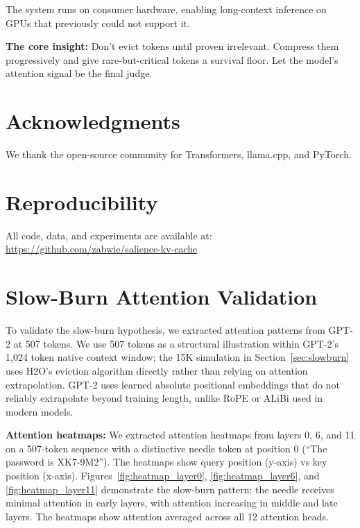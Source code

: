 \documentclass[11pt]{article}
\begin{document}
The system runs on consumer hardware, enabling long-context inference on GPUs that previously could not support it.

\textbf{The core insight:} Don't evict tokens until proven irrelevant. Compress them progressively and give rare-but-critical tokens a survival floor. Let the model's attention signal be the final judge.

\section*{Acknowledgments}

We thank the open-source community for Transformers, llama.cpp, and PyTorch.

\section*{Reproducibility}

All code, data, and experiments are available at: \url{https://github.com/zabwie/salience-kv-cache}

\appendix

\section{Slow-Burn Attention Validation}\label{sec:attention_validation}

To validate the slow-burn hypothesis, we extracted attention patterns from GPT-2 at 507 tokens. We use 507 tokens as a structural illustration within GPT-2's 1,024 token native context window; the 15K simulation in Section~\ref{sec:slowburn} uses H2O's eviction algorithm directly rather than relying on attention extrapolation. GPT-2 uses learned absolute positional embeddings that do not reliably extrapolate beyond training length, unlike RoPE or ALiBi used in modern models.

\textbf{Attention heatmaps:} We extracted attention heatmaps from layers 0, 6, and 11 on a 507-token sequence with a distinctive needle token at position 0 (``The password is XK7-9M2''). The heatmaps show query position (y-axis) vs key position (x-axis). Figures~\ref{fig:heatmap_layer0}, \ref{fig:heatmap_layer6}, and \ref{fig:heatmap_layer11} demonstrate the slow-burn pattern: the needle receives minimal attention in early layers, with attention increasing in middle and late layers. The heatmaps show attention averaged across all 12 attention heads.
\end{document}

